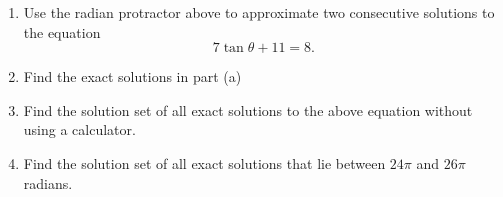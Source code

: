 \documentclass{ximera}
\begin{document}
\begin{question}  \label{QDEFklEFR33g3e}

 
\begin{onlineOnly}
    \begin{center}
\end{center}
\end{onlineOnly}

\begin{enumerate}
\item Use the radian protractor above to approximate two consecutive solutions to the equation
\[
   7 \tan\theta +11 =  8 .  
\]

\item Find the exact solutions in part (a)

\item Find the solution set of all exact solutions to the above equation without using a calculator.

\item Find the solution set of all exact solutions that lie between $24\pi$ and $26\pi$ radians.

\end{enumerate}
\end{question}

 
\end{document}
